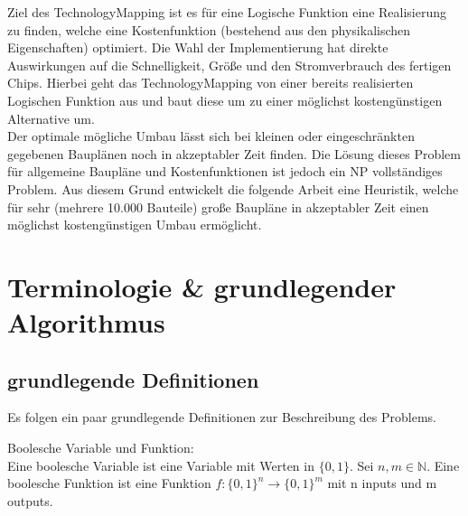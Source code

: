 \documentclass[11pt, a4paper, german]{article}
\newcommand{\TM}{TechnologyMapping }
\begin{document}
Ziel des \TM ist es für eine Logische Funktion eine Realisierung zu finden, welche eine Kostenfunktion (bestehend aus den physikalischen Eigenschaften) optimiert. Die Wahl der Implementierung hat direkte Auswirkungen auf die  Schnelligkeit, Größe und den Stromverbrauch des fertigen Chips. Hierbei geht das \TM von einer bereits realisierten Logischen Funktion aus und baut diese um zu einer möglichst kostengünstigen Alternative um. \\
Der optimale mögliche Umbau lässt sich bei kleinen oder eingeschränkten gegebenen Bauplänen noch in akzeptabler Zeit finden. Die Lösung dieses Problem für allgemeine Baupläne und Kostenfunktionen ist jedoch ein NP vollständiges Problem. Aus diesem Grund entwickelt die folgende Arbeit eine Heuristik, welche für sehr (mehrere 10.000 Bauteile) große Baupläne in akzeptabler Zeit einen möglichst kostengünstigen Umbau ermöglicht.
\newpage

\section{Terminologie \& grundlegender Algorithmus}
\subsection{grundlegende Definitionen}
Es folgen ein paar grundlegende Definitionen zur Beschreibung des Problems.

\begin{definition}{Boolesche Variable und Funktion: } \\
Eine boolesche Variable ist eine Variable mit Werten in $ \{ 0 , 1 \} $.
Sei $ n, m \in \mathbb{N}$. Eine boolesche Funktion ist eine Funktion $ f : \{ 0 , 1 \}^n \rightarrow \{ 0 , 1 \}^m $ mit n inputs und m outputs. 
\end{definition}
\end{document}

